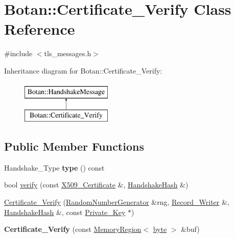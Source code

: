 \hypertarget{classBotan_1_1Certificate__Verify}{\section{Botan\-:\-:Certificate\-\_\-\-Verify Class Reference}
\label{classBotan_1_1Certificate__Verify}
}


{\ttfamily \#include $<$tls\-\_\-messages.\-h$>$}

Inheritance diagram for Botan\-:\-:Certificate\-\_\-\-Verify\-:\begin{figure}[H]
\begin{center}
\leavevmode
\includegraphics[height=2.000000cm]{classBotan_1_1Certificate__Verify}
\end{center}
\end{figure}
\subsection*{Public Member Functions}
\begin{DoxyCompactItemize}
\item 
\hypertarget{classBotan_1_1Certificate__Verify_aa990f430fdd7fb64b1b44697e5ae1d96}{Handshake\-\_\-\-Type {\bfseries type} () const }\label{classBotan_1_1Certificate__Verify_aa990f430fdd7fb64b1b44697e5ae1d96}

\item 
bool \hyperlink{classBotan_1_1Certificate__Verify_a207634a4c3f3842729f8a67342067284}{verify} (const \hyperlink{classBotan_1_1X509__Certificate}{X509\-\_\-\-Certificate} \&, \hyperlink{classBotan_1_1HandshakeHash}{Handshake\-Hash} \&)
\item 
\hyperlink{classBotan_1_1Certificate__Verify_afbe0f247789a908efe0bce68aa70715f}{Certificate\-\_\-\-Verify} (\hyperlink{classBotan_1_1RandomNumberGenerator}{Random\-Number\-Generator} \&rng, \hyperlink{classBotan_1_1Record__Writer}{Record\-\_\-\-Writer} \&, \hyperlink{classBotan_1_1HandshakeHash}{Handshake\-Hash} \&, const \hyperlink{classBotan_1_1Private__Key}{Private\-\_\-\-Key} $\ast$)
\item 
\hypertarget{classBotan_1_1Certificate__Verify_a8d42e753790210e741f24559067a8ee7}{{\bfseries Certificate\-\_\-\-Verify} (const \hyperlink{classBotan_1_1MemoryRegion}{Memory\-Region}$<$ \hyperlink{namespaceBotan_a7d793989d801281df48c6b19616b8b84}{byte} $>$ \&buf)}\label{classBotan_1_1Certificate__Verify_a8d42e753790210e741f24559067a8ee7}

\end{DoxyCompactItemize}



